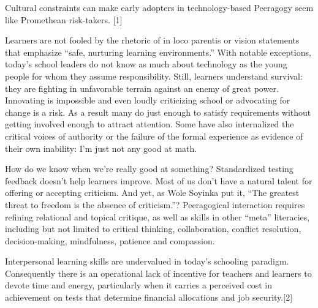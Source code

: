 
Cultural constraints can make early adopters in technology-based
Peeragogy seem like Promethean risk-takers. {[}1{]}

Learners are not fooled by the rhetoric of in loco parentis or vision
statements that emphasize ``safe, nurturing learning environments.''
With notable exceptions, today's school leaders do not know as much
about technology as the young people for whom they assume
responsibility. Still, learners understand survival: they are fighting
in unfavorable terrain against an enemy of great power. Innovating is
impossible and even loudly criticizing school or advocating for change
is a risk. As a result many do just enough to satisfy requirements
without getting involved enough to attract attention. Some have also
internalized the critical voices of authority or the failure of the
formal experience as evidence of their own inability: I'm just not any
good at math.

How do we know when we're really good at something? Standardized testing
feedback doesn't help learners improve. Most of us don't have a natural
talent for offering or accepting criticism. And yet, as Wole Soyinka put
it, ``The greatest threat to freedom is the absence of criticism.''?
Peeragogical interaction requires refining relational and topical
critique, as well as skills in other ``meta'' literacies, including but
not limited to critical thinking, collaboration, conflict resolution,
decision-making, mindfulness, patience and compassion.

Interpersonal learning skills are undervalued in today's schooling
paradigm. Consequently there is an operational lack of incentive for
teachers and learners to devote time and energy, particularly when it
carries a perceived cost in achievement on tests that determine
financial allocations and job security.{[}2{]}

